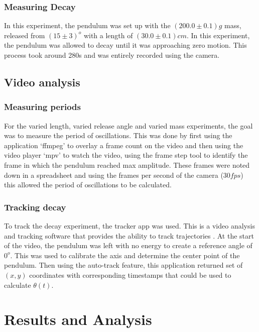 \documentclass[
	letterpaper
	12pt
]{template}
\begin{document}
\subsubsection{Measuring Decay}
In this experiment, the pendulum was set up with the $(200.0\pm 0.1)\unit{g}$ mass, released from $(15\pm3)^o$ with a length of $(30.0\pm0.1)\unit{cm}$. In this experiment, the pendulum was allowed to decay until it was approaching zero motion. This process took around 280s and was entirely recorded using the camera.
\subsection{Video analysis}
\subsubsection{Measuring periods}
For the varied length, varied release angle and varied mass experiments, the goal was to measure the period of oscillations. This was done by first using the application `ffmpeg' to overlay a frame count on the video and then using the video player `mpv' to watch the video, using the frame step tool to identify the frame in which the pendulum reached max amplitude. These frames were noted down in a spreadsheet and using the frames per second of the camera ($30\unit{fps}$) this allowed the period of oscillations to be calculated.
\subsubsection{Tracking decay}
To track the decay experiment, the tracker app was used. This is a video analysis and tracking software that provides the ability to track trajectories \cite{tracker}. At the start of the video, the pendulum was left with no energy to create a reference angle of $0^o$. This was used to calibrate the axis and determine the center point of the pendulum. Then using the auto-track feature, this application returned set of $(x,y)$ coordinates with corresponding timestamps that could be used to calculate $\theta(t)$.

\section{Results and Analysis}
\end{document}
